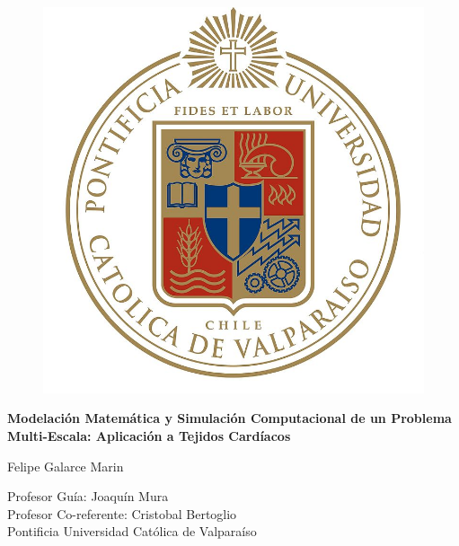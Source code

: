\documentclass[11pt]{beamer}
\begin{document}
	
	\begin{frame}
		\begin{figure}
			\centering
			\includegraphics[width=2 cm]{fig/PUCV}
		\end{figure}
		\begin{center}
			\large{ \textbf{Modelación Matemática y Simulación Computacional de un Problema Multi-Escala: Aplicación a Tejidos Cardíacos}}			
		\end{center}
		\begin{center}
			\normalsize{Felipe Galarce Marin} \\[0.2 cm]
			\begin{small}	
							
			Profesor Guía: Joaquín Mura\\
			Profesor Co-referente: Cristobal Bertoglio \\
			Pontificia Universidad Católica de Valparaíso
			\end{small}
		\end{center}
	\end{frame}
\end{document}
